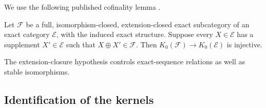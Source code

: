 We use the following published cofinality lemma
\citep[Chapter~II, Lemma~7.2, p.~62 of the author's chapter
version]{Weibel2013}.

\begin{lemma}[Cofinality]\label{lem:completion-elementary-cofinality}
Let $\mathcal F$ be a full, isomorphism-closed, extension-closed
exact subcategory of an exact category $\mathcal E$, with the
induced exact structure.  Suppose every $X\in\mathcal E$ has a
supplement $X'\in\mathcal E$ such that
$X\oplus X'\in\mathcal F$.  Then
$K_0(\mathcal F)\to K_0(\mathcal E)$ is injective.
\end{lemma}

The extension-closure hypothesis controls exact-sequence relations
as well as stable isomorphisms.

\subsection{Identification of the kernels}


